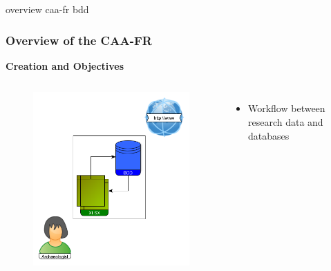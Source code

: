 \documentclass[t,aspectratio=169,xcolor=dvipsnames]{beamer}
\begin{document}
\begin{frame}{overview caa-fr bdd}

    \frametitle{Overview of the CAA-FR} 

    \begin{block}{\textbf{Creation and Objectives}} %
    \end{block}

    \begin{columns}[t]
    	
    	
    	\begin{figure}
    		\includegraphics[height=0.68\textheight]{figures/bdd_uni_simple.png}
    	\end{figure}
    	
    	
    	\begin{itemize}
    		\item Workflow between research data and databases
    	\end{itemize}
    	
    \end{columns}

    \end{frame}
\end{document}
